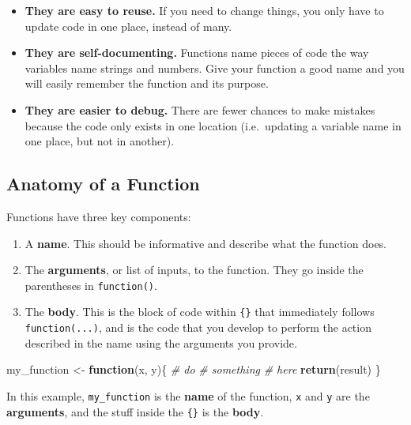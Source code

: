 \documentclass[]{book}
\newenvironment{Shaded}{\begin{snugshade}}{\end{snugshade}}
\newcommand{\CommentTok}[1]{\textcolor[rgb]{0.56,0.35,0.01}{\textit{#1}}}
\newcommand{\ControlFlowTok}[1]{\textcolor[rgb]{0.13,0.29,0.53}{\textbf{#1}}}
\newcommand{\KeywordTok}[1]{\textcolor[rgb]{0.13,0.29,0.53}{\textbf{#1}}}
\newcommand{\NormalTok}[1]{#1}
\newcommand{\StringTok}[1]{\textcolor[rgb]{0.31,0.60,0.02}{#1}}
\providecommand{\tightlist}{%
  \setlength{\itemsep}{0pt}\setlength{\parskip}{0pt}}
\begin{document}
\begin{itemize}
\item
  \textbf{They are easy to reuse.} If you need to change things, you only have to update code in one place, instead of many.
\item
  \textbf{They are self-documenting.} Functions name pieces of code the way variables name strings and numbers. Give your function a good name and you will easily remember the function and its purpose.
\item
  \textbf{They are easier to debug.} There are fewer chances to make mistakes because the code only exists in one location (i.e.~updating a variable name in one place, but not in another).
\end{itemize}

\hypertarget{anatomy-of-a-function}{%
\subsection{Anatomy of a Function}\label{anatomy-of-a-function}}

Functions have three key components:

\begin{enumerate}
\def\labelenumi{\arabic{enumi}.}
\tightlist
\item
  A \textbf{name}. This should be informative and describe what the function does.
\item
  The \textbf{arguments}, or list of inputs, to the function. They go inside the parentheses in \texttt{function()}.
\item
  The \textbf{body}. This is the block of code within \texttt{\{\}} that immediately follows \texttt{function(...)}, and is the code that you develop to perform the action described in the name using the arguments you provide.
\end{enumerate}

\begin{Shaded}
\begin{Highlighting}[]
\NormalTok{my_function <-}\StringTok{ }\ControlFlowTok{function}\NormalTok{(x, y)\{}
  \CommentTok{# do}
  \CommentTok{# something}
  \CommentTok{# here}
  \KeywordTok{return}\NormalTok{(result)}
\NormalTok{\}}
\end{Highlighting}
\end{Shaded}

In this example, \texttt{my\_function} is the \textbf{name} of the function, \texttt{x} and \texttt{y} are the \textbf{arguments}, and the stuff inside the \texttt{\{\}} is the \textbf{body}.
\end{document}
